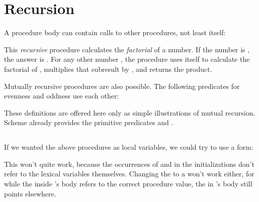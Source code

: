 \chapter{Recursion}
\label{rec}

A procedure body can contain calls to other procedures,
not least itself:


\n This {\em recursive} procedure calculates the {\em
factorial} of a number.  If the number is , the
answer is .  For any other number , the
procedure uses itself to calculate the factorial of
, multiplies that subresult by , and
returns the product.

Mutually recursive procedures are also possible.  The
following predicates for evenness and oddness use each
other:



These definitions are offered here only as simple
illustrations of mutual recursion.  Scheme already
provides the primitive predicates  and
.


\section{}

If we wanted the above procedures as local
variables, we could try to use a  form:


\n This won’t quite work, because the occurrences of
 and  in the initializations
don’t refer to the lexical variables themselves.
Changing the  to a  won’t work either,
for while the  inside ’s body
refers to the correct procedure value, the 
in ’s body still points elsewhere.

